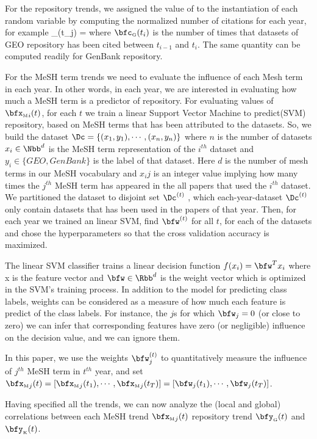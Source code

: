 \documentclass[twoside,11pt]{article}
\def\bfyg{\bfy_{\text{\tiny G}}}
\def\bfyk{\bfy_{\text{\tiny K}}}
\def\bfxm{{\bfx_{\text{\tiny M}}}}
\begin{document}
For the repository trends, we assigned the value of to the instantiation of each random variable by computing the normalized number of citations for each year, for example
\beq
\bfyg(t_j) = 
\eeq
where $\bfc_{\text{\tiny G}}(t_i)$ is the number of times that datasets of GEO repository has been cited between $t_{i-1}$ and $t_i$. The same quantity can be computed readily for GenBank repository.

For the MeSH term trends we need to evaluate the influence of each Mesh term in each year. In other words, in each year, we are interested in evaluating how much a  MeSH term is a predictor of repository. For evaluating values of $\bfxm_i(t)$, for each $t$ we train a linear Support Vector Machine to predict(SVM) repository, based on MeSH terms that has been attributed to the datasets. So, we build the dataset $\Dc=\{(x_1,y_1), \cdots , (x_n,y_n) \}$ where $n$ is the number of datasets $x_i\in\Nbb^d$ is the MeSH term representation of the $i^{th}$ dataset and $y_i\in \{GEO,GenBank\}$ is the label of that dataset. Here $d$ is the number of mesh terms in our MeSH vocabulary and $x_ij$ is an integer value implying how many times the $j^{th}$ MeSH term has appeared in the all papers that used the $i^{th}$ dataset. We partitioned the dataset to disjoint set $\Dc^{(t)}$ , which each-year-dataset $\Dc^{(t)}$ only contain datasets that has been used in the papers of that year. Then, for each  year we trained an linear SVM, find $\bfw^{(t)}$ for all $t$, for each of the datasets and chose the hyperparameters so that the cross validation accuracy is maximized. 

The linear SVM classifier trains a linear decision function $f(x_i)=\bfw^T x_i$ where x is the feature vector and $\bfw \in \Rbb^d$ is the weight vector which is optimized in the SVM's training process. In addition to the model for predicting class labels, weights can be considered as a measure of how much each feature is predict of the class labels. For instance, the $j$s for which $\bfw_j=0$ (or close to zero) we can infer that corresponding features have zero (or negligible) influence on the decision value, and we can ignore them. 

In this paper, we use the weights $\bfw_j^{(t)}$ to quantitatively measure the influence of $j^{th}$ MeSH term in $t^{th}$ year, and set $\bfxm_j (t) = [\bfxm_j(t_1), \cdots, \bfxm_j(t_T) ] = [\bfw_j(t_1), \cdots, \bfw_j(t_T) ]$.

Having specified all the trends, we can now analyze the (local and global) correlations between each MeSH trend $\bfxm_j(t)$ repository trend $\bfyg(t)$ and $\bfyk(t)$.
\end{document}
